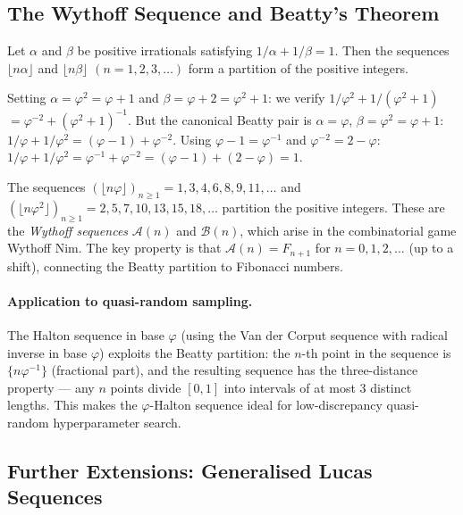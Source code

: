 \subsection{The Wythoff Sequence and Beatty's Theorem}
\label{subsec:gh-wythoff}

\begin{theorem}
\label{thm:gh-beatty}
Let \(\alpha\) and \(\beta\) be positive irrationals satisfying
\(1/\alpha + 1/\beta = 1\).  Then the sequences
\(\lfloor n\alpha \rfloor\) and \(\lfloor n\beta \rfloor\)
\((n = 1, 2, 3, \ldots)\) form a partition of the positive integers.
\end{theorem}

Setting \(\alpha = \varphi^2 = \varphi+1\) and
\(\beta = \varphi + 2 = \varphi^2 + 1\): we verify
\(1/\varphi^2 + 1/(\varphi^2+1)\)
\(= \varphi^{-2} + (\varphi^2+1)^{-1}\).
But the canonical Beatty pair is \(\alpha = \varphi\),
\(\beta = \varphi^2 = \varphi+1\): \(1/\varphi + 1/\varphi^2 = (\varphi-1) + \varphi^{-2}\).
Using \(\varphi-1 = \varphi^{-1}\) and \(\varphi^{-2} = 2-\varphi\):
\(1/\varphi + 1/\varphi^2 = \varphi^{-1} + \varphi^{-2} = (\varphi-1)+(2-\varphi) = 1\). \checkmark

The sequences \((\lfloor n\varphi \rfloor)_{n \geq 1} = 1,3,4,6,8,9,11,\ldots\)
and \((\lfloor n\varphi^2 \rfloor)_{n \geq 1} = 2,5,7,10,13,15,18,\ldots\)
partition the positive integers.
These are the \emph{Wythoff sequences} \(\mathcal{A}(n)\) and
\(\mathcal{B}(n)\), which arise in the combinatorial game Wythoff Nim.
The key property is that \(\mathcal{A}(n) = F_{n+1}\) for
\(n = 0, 1, 2, \ldots\) (up to a shift), connecting the Beatty
partition to Fibonacci numbers.

\paragraph{Application to quasi-random sampling.}
The Halton sequence in base \(\varphi\) (using the
Van der Corput sequence with radical inverse in base \(\varphi\))
exploits the Beatty partition: the \(n\)-th point in the sequence
is \(\{n\varphi^{-1}\}\) (fractional part), and the resulting
sequence has the three-distance property — any \(n\) points
divide \([0,1]\) into intervals of at most 3 distinct lengths.
This makes the \(\varphi\)-Halton sequence ideal for
low-discrepancy quasi-random hyperparameter search.

\subsection{Further Extensions: Generalised Lucas Sequences}
\label{subsec:gh-generalised}

